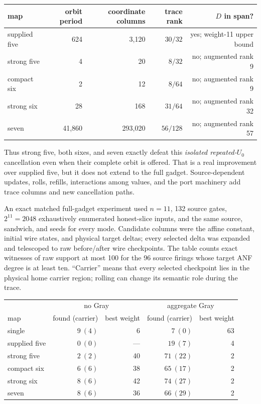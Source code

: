 \documentclass[11pt]{article}
\begin{document}
\begin{center}
\begin{tabular}{@{}lrrrr@{}}
\toprule
map & orbit period & coordinate columns & trace rank & $D$ in span? \\
\midrule
supplied five & 624 & 3,120 & $30/32$ & yes; weight-11 upper bound \\
strong five & 4 & 20 & $8/32$ & no; augmented rank 9 \\
compact six & 2 & 12 & $8/64$ & no; augmented rank 9 \\
strong six & 28 & 168 & $31/64$ & no; augmented rank 32 \\
seven & 41,860 & 293,020 & $56/128$ & no; augmented rank 57 \\
\bottomrule
\end{tabular}
\end{center}

Thus strong five, both sixes, and seven exactly defeat this \emph{isolated
repeated-$U_0$} cancellation even when their complete orbit is offered.  That
is a real improvement over supplied five, but it does not extend to the full
gadget.  Source-dependent updates, rolls, refills, interactions among values,
and the port machinery add trace columns and new cancellation paths.

An exact matched full-gadget experiment used $n=11$, 132 source gates,
$2^{11}=2048$ exhaustively enumerated honest-slice inputs, and the same source,
sandwich, and seeds for every mode.  Candidate columns were the affine
constant, initial wire states, and physical target deltas; every selected delta
was expanded and telescoped to raw before/after wire checkpoints.  The table
counts exact witnesses of raw support at most 100 for the 96 source firings
whose target ANF degree is at least ten.  ``Carrier'' means that every selected
checkpoint lies in the physical home carrier region; rolling can change its
semantic role during the trace.

\begin{center}
\begin{tabular}{@{}lrr rr@{}}
\toprule
& \multicolumn{2}{c}{no Gray} & \multicolumn{2}{c}{aggregate Gray} \\
map & found (carrier) & best weight & found (carrier) & best weight \\
\midrule
single & $9\ (4)$ & 6 & $7\ (0)$ & 63 \\
supplied five & $0\ (0)$ & --- & $19\ (7)$ & 4 \\
strong five & $2\ (2)$ & 40 & $71\ (22)$ & 2 \\
compact six & $6\ (6)$ & 38 & $65\ (17)$ & 2 \\
strong six & $8\ (6)$ & 42 & $74\ (27)$ & 2 \\
seven & $8\ (6)$ & 36 & $66\ (29)$ & 2 \\
\bottomrule
\end{tabular}
\end{center}
\end{document}
